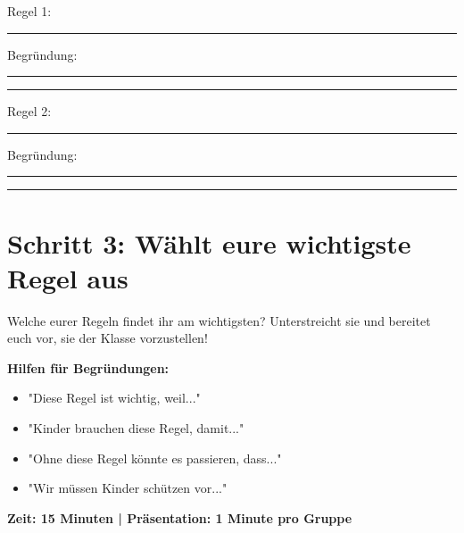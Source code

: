 \documentclass[12pt, a4paper]{article}
\newenvironment{taskbox}{%
    \begin{framed}
        \color{black}
    }{%
    \end{framed}
}
\begin{document}
    \begin{taskbox}
        Regel 1: \rule{\linewidth}{0.4pt}

        Begründung: \rule{\linewidth}{0.4pt}
        \rule{\linewidth}{0.4pt}

        \vspace{0.5cm}

        Regel 2: \rule{\linewidth}{0.4pt}

        Begründung: \rule{\linewidth}{0.4pt}
        \rule{\linewidth}{0.4pt}
    \end{taskbox}

    \vspace{0.3cm}

    \section*{\large\color{headercolor}Schritt 3: Wählt eure wichtigste Regel aus}
    
    \begin{taskbox}
        Welche eurer Regeln findet ihr am wichtigsten? Unterstreicht sie und bereitet euch vor, sie der Klasse vorzustellen!

        \vspace{0.3cm}
        \textbf{Hilfen für Begründungen:}
        \begin{itemize}
            \item "Diese Regel ist wichtig, weil..."
            \item "Kinder brauchen diese Regel, damit..."
            \item "Ohne diese Regel könnte es passieren, dass..."
            \item "Wir müssen Kinder schützen vor..."
        \end{itemize}
    \end{taskbox}

    \vspace{0.5cm}
    \centering\large\textbf{Zeit: 15 Minuten | Präsentation: 1 Minute pro Gruppe}
\end{document}
